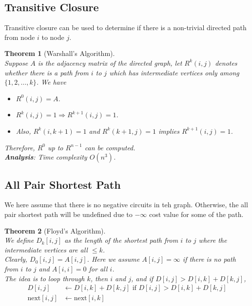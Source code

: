 \documentclass[12pt]{article}
\newtheorem{theorem}{Theorem}[section]
\theoremstyle{definition}
\begin{document}
\subsection{Transitive Closure}
Transitive closure can be used to determine if there is a non-trivial directed path from node $i$ to node $j$.
\begin{theorem}[Warshall's Algorithm]
\hfill\\\normalfont Suppose $A$ is the adjacency matrix of the directed graph, let $R^k(i,j)$ denotes whether there is a path from $i$ to $j$ which has intermediate vertices only among $\{1,2,\ldots, k\}$. We have
\begin{itemize}
	\item $R^{0}(i,j)=A$.
	\item $R^{k}(i,j)=1\Rightarrow R^{k+1}(i,j)=1$.
	\item Also, $R^k(i,k+1)=1$ and $R^k(k+1, j)=1$ implies $R^{k+1}(i,j)=1$.
\end{itemize}
Therefore, $R^0$ up to $R^{n-1}$ can be computed.\\
\textbf{Analysis}: Time complexity $O(n^3)$.
\end{theorem}
\subsection{All Pair Shortest Path}
We here assume that there is no negative circuits in teh graph. Otherwise, the all pair shortest path will be undefined due to $-\infty$ cost value for some of the path.
\begin{theorem}[Floyd's Algorithm]
\hfill\\\normalfont We define $D_k[i,j]$ as the length of the shortest path from $i$ to $j$ where the intermediate vertices are all $\leq k$. \\
Clearly, $D_0[i,j]=A[i,j]$. Here we assume $A[i,j]=\infty$ if there is no path from $i$ to $j$ and $A[i,i]=0$ for all $i$.\\
The idea is to loop through $k$, then $i$ and $j$, and if $D[i,j]>D[i,k]+D[k,j]$, 
\begin{align*}
D[i,j]&\leftarrow D[i,k]+D[k,j] \text{ if }D[i,j]>D[i,k]+D[k,j]\\
\text{next}[i,j]&\leftarrow \text{next}[i,k]
\end{align*}
\end{theorem}
\end{document}

